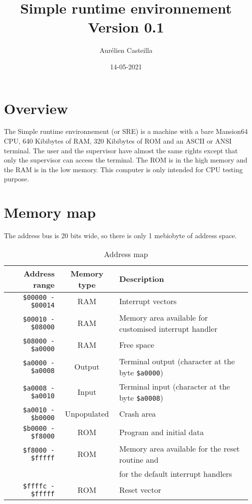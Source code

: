 \documentclass[11pt]{article}
\author{Aurélien Casteilla}
\title{Simple runtime environnement \\[1ex] \large Version 0.1}
\date{14-05-2021}
\begin{document}
\maketitle
\newpage

\section{Overview}
The Simple runtime environnement (or SRE) is a machine with a bare Mansion64
CPU, 640 Kibibytes of RAM, 320 Kibibytes of ROM and an ASCII or ANSI terminal.
The user and the supervisor have almost the same rights except that only the
supervisor can access the terminal. The ROM is in the high memory and the RAM
is in the low memory. This computer is only intended for CPU testing purpose.

\section{Memory map}

The address bus is 20 bits wide, so there is only 1 mebiobyte of address space.

\begin{table}[h!]
    \begin{center}
        \caption{Address map}
        \label{tab:addmap}
        \begin{tabular}{|r|c|l|}
            \hline
            Address range & Memory type & Description \\
            \hline
            \texttt{\$00000 - \$00014} & RAM & Interrupt vectors \\
            \hline
            \texttt{\$00010 - \$08000} & RAM & Memory area available for customised
            interrupt handler \\
            \hline
            \texttt{\$08000 - \$a0000} & RAM & Free space \\
            \hline
            \texttt{\$a0000 - \$a0008} & Output & Terminal output (character
            at the byte \texttt{\$a0000})\\
            \hline
            \texttt{\$a0008 - \$a0010} & Input & Terminal input (character at the byte
            \texttt{\$a0008}) \\ 
            \hline
            \texttt{\$a0010 - \$b0000} & Unpopulated & Crash area \\
            \hline
            \texttt{\$b0000 - \$f8000} & ROM & Program and initial data \\
            \hline
            \texttt{\$f8000 - \$fffff} & ROM & Memory area available for the reset
            routine and \\
            & & for the default interrupt handlers \\
            \hline
            \texttt{\$ffffc - \$fffff} & ROM & Reset vector \\
            \hline
        \end{tabular}
    \end{center}
\end{table}
\end{document}
